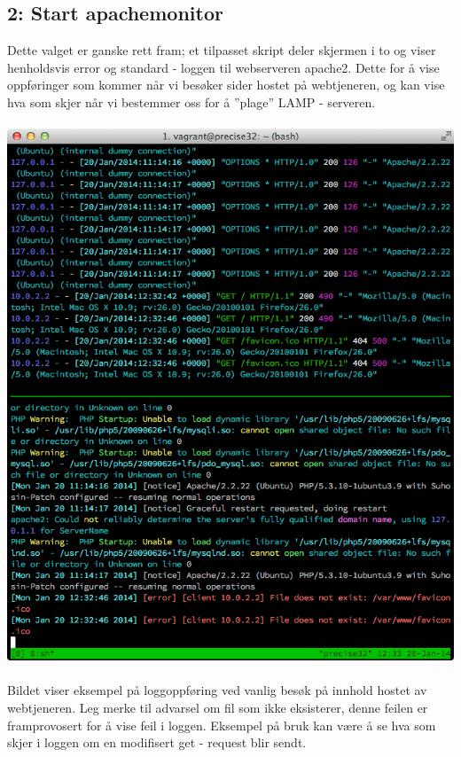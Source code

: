 \documentclass{article}
\begin{document}
\subsection{2: Start apachemonitor} 
Dette valget er ganske rett fram; et tilpasset skript deler skjermen i to og viser henholdsvis error og standard - loggen til webserveren apache2. Dette for å vise oppføringer som kommer når vi besøker sider hostet på webtjeneren, og kan vise hva som skjer når vi bestemmer oss for å ''plage'' LAMP - serveren.
\\ \\
\includegraphics[scale= 0.7]{pictures/apachelogg.png}
\\ \\
Bildet viser eksempel på loggoppføring ved vanlig besøk på innhold hostet av webtjeneren. Leg merke til advarsel om fil som ikke eksisterer, denne feilen er framprovosert for å vise feil i loggen. Eksempel på bruk kan være å se hva som skjer i loggen om en modifisert get - request blir sendt. 
\end{document}
